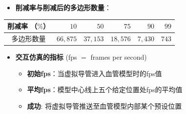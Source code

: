 \begin{frame}
\begin{itemize}
  \item \textbf{削减率与削减后的多边形数量}：
\end{itemize}
\begin{table}[h]
\renewcommand{\arraystretch}{0.5}
\centering
\begin{tabular*}{90mm}{c r r r r r}
\toprule
\hspace{2mm} \small{削减率 （$\%$）}  &     \small{$10$} &     \small{$50$} &     \small{$75$} &    \small{$90$} &  \small{$99$} \\
\midrule
\hspace{2mm} \small{多边形数量}     & \small{$66,875$} & \small{$37,153$} & \small{$18,576$} & \small{$7,430$} & \small{$743$} \\
\bottomrule
\end{tabular*}
\end{table}
\end{frame}

\begin{frame}
\begin{itemize}
\item \textbf{交互仿真的指标} (fps $=$ frames per second)
\begin{itemize}
\item \textbf{初始fps}：当虚拟导管进入血管模型时的fps值
\item \textbf{平均fps}：模型中心线上五个给定位置处fps的平均值
\item \textbf{成功}: 将虚拟导管推送至血管模型内部某个预设位置
\end{itemize}
\end{itemize}
\end{frame}

